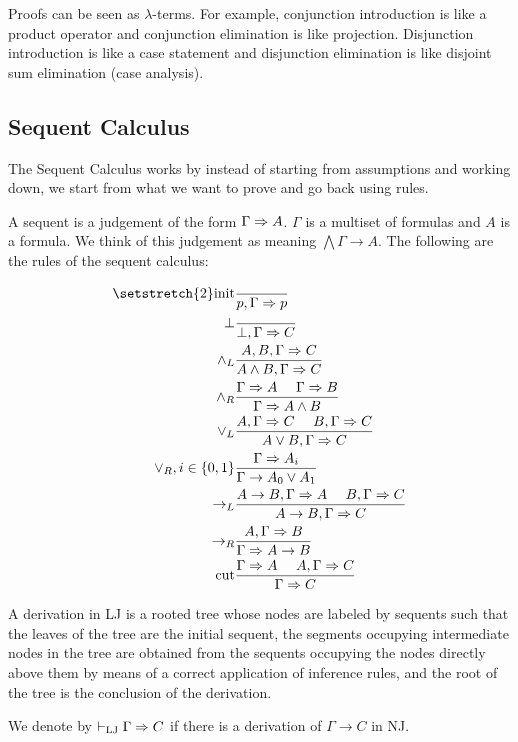Proofs can be seen as $\lambda$-terms. 
For example, conjunction introduction is like a product operator and conjunction elimination is like projection.
Disjunction introduction is like a case statement and disjunction elimination is like disjoint sum elimination
(case analysis).

\subsection{Sequent Calculus}
The Sequent Calculus works by instead of starting from assumptions and working down, we start from
what we want to prove and go back using rules.

A sequent is a judgement of the form $\Gamma \Rightarrow A$. $\Gamma$ is a multiset of formulas and $A$ is a formula.
We think of this judgement as meaning $\bigwedge \Gamma \to A$. The following are the rules of the
sequent calculus:

\begin{alignat*}{2}
\setstretch{2}
\text{init}&\frac{}{p, \Gamma \To p} \\
\bottom&\frac{}{\bottom, \Gamma \To C}\\
\wedge_L&\frac{A, B, \Gamma \To C}{A\wedge B, \Gamma \To C}\\
\wedge_R&\frac{\Gamma \To A~~~~\Gamma\To B}{\Gamma \To A \wedge B}\\
\vee_L&\frac{A, \Gamma \To C~~~~B, \Gamma \To C}{A\vee B, \Gamma \To C}\\
\vee_R, i\in \{0,1\}&\frac{\Gamma \To A_i}{\Gamma \to A_0 \vee A_1}\\
\to_L&\frac{A\to B, \Gamma \To A~~~~B, \Gamma \To C}{A\to B, \Gamma \To C}\\
\to_R&\frac{A, \Gamma \To B}{\Gamma \To A \to B}\\
\text{cut}&\frac{\Gamma \To A~~~~A, \Gamma \To C}{\Gamma \To C}
\end{alignat*}

A derivation in LJ is a rooted tree whose nodes are labeled by sequents such that
the leaves of the tree are the initial sequent, the segments occupying
intermediate nodes in the tree are obtained from the sequents occupying
 the nodes directly above them by means of a correct application of inference rules,
 and the root of the tree is the conclusion of the derivation.

We denote by $\vdash_\mathrm{LJ} \Gamma \Rightarrow C$ if there is a derivation of $\Gamma \to C$ in NJ.

